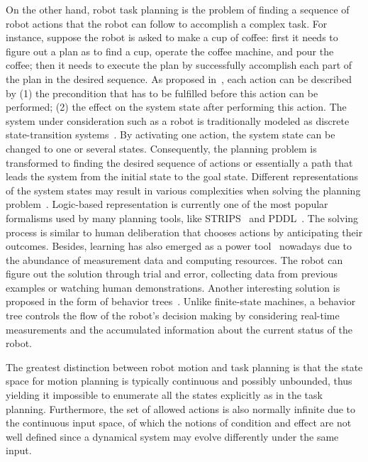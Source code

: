 On the other hand, robot task planning is the problem of finding a sequence of robot {actions} that the robot can follow to accomplish a complex task.
For instance,  suppose the robot is asked to make a cup of coffee:  first it needs to figure out  a plan as to find a cup, operate the coffee machine, and pour the coffee; then it needs to execute the plan by successfully accomplish each part of the plan in the desired sequence.
As proposed in~\cite{ghallab2004automated}, each action can be described by (1) the {precondition} that has to be fulfilled before this action can be performed; (2) the {effect} on the system state after performing this action.
The system under consideration such as a robot is traditionally modeled as discrete {state-transition systems}~\cite{dean1991planning}. By activating one action, the system state can be changed to one or several states.
Consequently, the planning problem is transformed to finding the desired sequence of actions or essentially a path that leads the system from the initial state to the goal state.
Different representations of the system states may result in various complexities when solving the planning problem~\cite{ghallab2004automated}.
Logic-based representation is currently one of the most popular formalisms used by many planning tools, like STRIPS~\cite{fikes1972strips} and PDDL~\cite{mcdermott1998pddl}. The solving process is similar to human deliberation that chooses actions by anticipating their outcomes.
Besides, learning has also emerged as a power tool~\cite{krizhevsky2012imagenet}  nowadays due to the abundance of measurement data and computing resources. The robot can figure out the solution through trial and error, collecting data from previous examples or watching human demonstrations.
Another interesting solution is proposed in the form of behavior trees~\cite{ogren2012increasing, marzinotto2014towards}.
Unlike finite-state machines, a behavior tree controls the flow of the robot's decision making by considering real-time measurements and the accumulated information about the current status of the robot.


The greatest distinction between robot motion and task planning is that the state space for motion planning is typically continuous and possibly unbounded, thus yielding it impossible to enumerate all the states explicitly as in the task planning. Furthermore, the set of allowed actions is also normally infinite due to the continuous input space, of which the notions of condition and effect are not well defined since a dynamical system may evolve differently under the same input.


